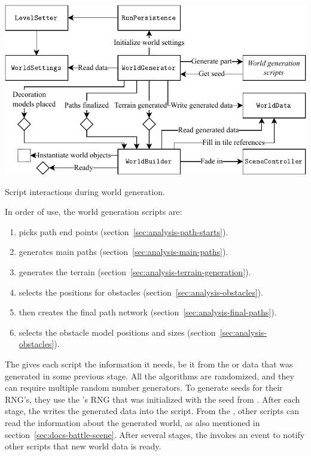 \begin{center}
    \captionsetup{type=figure}
    \includegraphics[width=\textwidth]{img/world generator.pdf}
    \caption{Script interactions during world generation.}
    \label{fig:world-generator}
\end{center}

In order of use, the world generation scripts are:
\begin{enumerate}
    \item {} picks path end points (section~\ref{sec:analysis-path-starts}).
    \item {} generates main paths (section~\ref{sec:analysis-main-paths}).
    \item {} generates the terrain (section~\ref{sec:analysis-terrain-generation}).
    \item {} selects the positions for obstacles (section~\ref{sec:analysis-obstacles}).
    \item {} then creates the final path network (section~\ref{sec:analysis-final-paths}).
    \item {} selects the obstacle model positions and sizes (section~\ref{sec:analysis-obstacles}).
\end{enumerate}

The  gives each script the information it needs, be it from the  or data that was generated in some previous stage.
All the algorithms are randomized, and they can require multiple random number generators.
To generate seeds for their RNG's, they use the 's RNG that was initialized with the seed from .
After each stage, the  writes the generated data into the  script.
From the , other scripts can read the information about the generated world, as also mentioned in section~\ref{sec:docs-battle-scene}.
After several stages, the  invokes an event to notify other scripts that new world data is ready.

